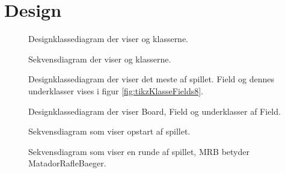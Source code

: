 

\chapter{Design}\label{chap:design}

\begin{figure}
\caption{Designklassediagram der viser  og  klasserne.}\label{fig:tikzKlasseKontoPlayer17}
\centering

\end{figure}

\begin{figure}
\caption{Sekvensdiagram der viser  og  klasserne.}\label{fig:tikzSekvensKontoPlayer17}
\centering

\end{figure}
\begin{figure}
\caption{Designklassediagram der viser det meste af spillet. Field og dennes underklasser vises i figur \vref{fig:tikzKlasseFields8}.}\label{fig:tikzKlasseMinusFields8}
\centering

\end{figure}

\begin{figure}
\caption{Designklassediagram der viser Board, Field og underklasser af Field.}\label{fig:tikzKlasseFields8}
\centering

\end{figure}

\begin{figure}
\caption{Sekvensdiagram som viser opstart af spillet.}\label{fig:tikzSekvensStartGame8}
\centering

\end{figure}

\begin{figure}
\centering
\caption{Sekvensdiagram som viser en runde af spillet, MRB betyder MatadorRafleBaeger.}\label{fig:tikzSekvensGame8}
\end{figure}